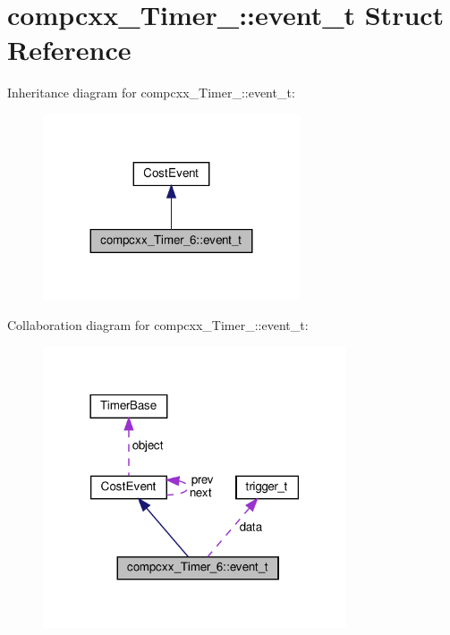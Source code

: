\hypertarget{structcompcxx__Timer__6_1_1event__t}{}\section{compcxx\+\_\+\+Timer\+\_\+:\+:event\+\_\+t Struct Reference}
\label{structcompcxx__Timer__6_1_1event__t}


Inheritance diagram for compcxx\+\_\+\+Timer\+\_\+:\+:event\+\_\+t\+:\nopagebreak
\begin{figure}[H]
\begin{center}
\leavevmode
\includegraphics[width=215pt]{structcompcxx__Timer__6_1_1event__t__inherit__graph}
\end{center}
\end{figure}


Collaboration diagram for compcxx\+\_\+\+Timer\+\_\+:\+:event\+\_\+t\+:\nopagebreak
\begin{figure}[H]
\begin{center}
\leavevmode
\includegraphics[width=254pt]{structcompcxx__Timer__6_1_1event__t__coll__graph}
\end{center}
\end{figure}
